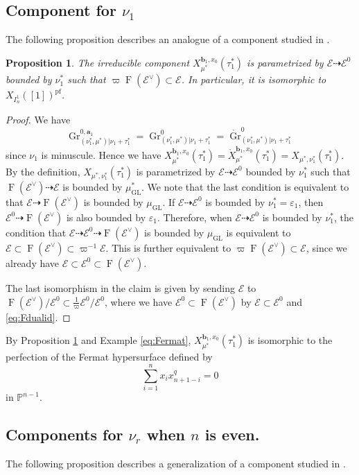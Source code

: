 \documentclass[12pt,a4paper]{article}
\newtheorem{prop}[thm]{Proposition}
\DeclareMathOperator{\Gr}{Gr}
\DeclareMathOperator{\GL}{GL}
\DeclareMathOperator{\oF}{F}
\newcommand{\bP}{\mathbb{P}}
\newcommand{\bfa}{\mathbf{a}}
\newcommand{\bfb}{\mathbf{b}}
\newcommand{\cE}{\mathcal{E}}
\newcommand{\pf}{\mathrm{pf}}
\begin{document}
\subsection{Component for $\nu_1$}
The following proposition describes an analogue of a component studied in \cite{VoWeGUII}. 

\begin{prop}\label{prop:nu1}
The irreducible component 
$X_{\mu^*}^{\bfb_1,x_0}(\tau_1^*)$ is parametrized by $\cE \dashrightarrow \cE^0$ bounded by 
$\nu_1^*$ such that 
$\varpi \oF (\cE^{\vee}) \subset \cE$. 
In particular, it is isomorphic to 
$X_{I_{n}^{1}}([1])^{\pf}$. 
\end{prop}
\begin{proof}
We have 
\[
 \Gr^{0,\bfa_1}_{(\nu^*_1, \mu^*) | \nu_1 +\tau_1^*}
 =\Gr^{0}_{(\nu^*_1, \mu^*) | \nu_1 +\tau_1^*}
 =\mathring{\Gr}^{0}_{(\nu^*_1, \mu^*) | \nu_1 +\tau_1^*} 
\] 
since $\nu_1$ is minuscule. 
Hence we have 
$X_{\mu^*}^{\bfb_1,x_0}(\tau_1^*)=\mathring{X}_{\mu^*}^{\bfb_1,x_0}(\tau_1^*)=X_{\mu^*,\nu_1^*}(\tau_1^*)$. 
By the definition, 
$X_{\mu^*,\nu_1^*}(\tau_1^*)$ 
is parametrized by 
$\cE \dashrightarrow \cE^0$ bounded by 
$\nu_1^*$ such that 
$\oF (\cE^{\vee}) \dashrightarrow \cE$ 
is bounded by $\mu_{\GL}^*$. 
We note that the last condition is equivalent to that 
$\cE \dashrightarrow \oF (\cE^{\vee})$ 
is bounded by $\mu_{\GL}$. 
If $\cE \dashrightarrow \cE^0$ is bounded by 
$\nu_1^*=\varepsilon_1$, then $\cE^0 \dashrightarrow \oF (\cE^{\vee})$ is also bounded by 
$\varepsilon_1$. 
Therefore, when $\cE \dashrightarrow \cE^0$ is bounded by 
$\nu_1^*$, 
the condition that 
$\cE \dashrightarrow \cE^0 \dashrightarrow \oF (\cE^{\vee})$ 
is bounded by $\mu_{\GL}$ is equivalent to 
$\cE \subset \oF (\cE^{\vee}) \subset \varpi^{-1}\cE$. 
This is further equivalent to 
$\varpi \oF (\cE^{\vee}) \subset \cE$, since we already have 
$\cE \subset \cE^0 \subset \oF (\cE^{\vee})$. 

The last isomorphism in the claim 
is given by sending 
$\cE$ to 
$\oF (\cE^{\vee}) /\cE^0 \subset \frac{1}{\varpi} \cE^0/\cE^0$, where we have $\cE^0 \subset \oF (\cE^{\vee})$ by $\cE \subset \cE^0$ and \eqref{eq:Fdualid}.  
\end{proof}

By Proposition \ref{prop:nu1} and Example \ref{eq:Fermat}, $X_{\mu^*}^{\bfb_1,x_0}(\tau_1^*)$ 
is isomorphic to 
the perfection of the Fermat hypersurface 
defined by 
\[
\sum_{i=1}^n x_i x_{n+1-i}^q=0 
\]
in $\bP^{n-1}$. 

\subsection{Components for $\nu_r$ when $n$ is even.}
The following proposition describes a generalization of a component studied in \cite{HoPaGU22}. 
\end{document}
